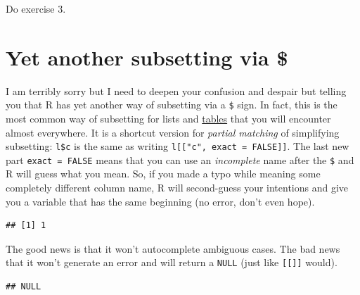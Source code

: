 \documentclass[
]{book}
\newenvironment{Shaded}{\begin{snugshade}}{\end{snugshade}}
\newcommand{\DecValTok}[1]{\textcolor[rgb]{0.00,0.00,0.81}{#1}}
\newcommand{\FunctionTok}[1]{\textcolor[rgb]{0.00,0.00,0.00}{#1}}
\newcommand{\NormalTok}[1]{#1}
\newcommand{\OtherTok}[1]{\textcolor[rgb]{0.56,0.35,0.01}{#1}}
\newcommand{\SpecialCharTok}[1]{\textcolor[rgb]{0.00,0.00,0.00}{#1}}
\newcommand{\StringTok}[1]{\textcolor[rgb]{0.31,0.60,0.02}{#1}}
\begin{document}
Do exercise 3.

\hypertarget{dollar-subsetting}{%
\section{Yet another subsetting via \$}\label{dollar-subsetting}}

I am terribly sorry but I need to deepen your confusion and despair but telling you that R has yet another way of subsetting via a \texttt{\$} sign. In fact, this is the most common way of subsetting for lists and \protect\hyperlink{data.frame}{tables} that you will encounter almost everywhere. It is a shortcut version for \emph{partial matching} of simplifying subsetting: \texttt{l\$c} is the same as writing \texttt{l{[}{[}"c",\ exact\ =\ FALSE{]}{]}}. The last new part \texttt{exact\ =\ FALSE} means that you can use an \emph{incomplete} name after the \texttt{\$} and R will guess what you mean. So, if you made a typo while meaning some completely different column name, R will second-guess your intentions and give you a variable that has the same beginning (no error, don't even hope).

\begin{Shaded}
\end{Shaded}

\begin{verbatim}
## [1] 1
\end{verbatim}

The good news is that it won't autocomplete ambiguous cases. The bad news that it won't generate an error and will return a \texttt{NULL} (just like \texttt{{[}{[}{]}{]}} would).

\begin{Shaded}
\end{Shaded}

\begin{verbatim}
## NULL
\end{verbatim}
\end{document}
